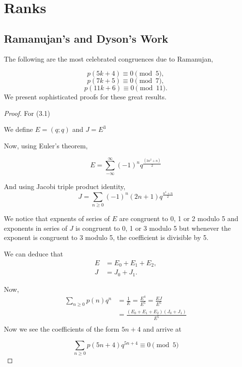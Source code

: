 \chapter{Ranks}
\section{Ramanujan's and Dyson's Work}

The following are the most celebrated congruences due to Ramanujan,

\begin{equation}
    p(5k+4) \equiv 0 \pmod 5,
\end{equation} 
\begin{equation}
    p(7k+5) \equiv 0 \pmod 7,
\end{equation} 
\begin{equation}
    p(11k+6) \equiv 0 \pmod{11}.
\end{equation}
We present sophisticated proofs for these great results.
\begin{proof}
For (3.1)

We define $E = (q;q)$ and $J = E^3$

Now, using Euler's theorem,

$$E = \sum_{-\infty}^\infty (-1)^n q^{\frac{(3n^2+n)}{2}}$$

And using Jacobi triple product identity,
$$J = \sum_{n\geq 0}(-1)^n(2n+1)q^{\frac{n^2+n}{2}}$$

We notice that expnents of series of $E$ are congruent to 0, 1 or 2 modulo 5 and exponents in series of $J$ is congruent to 0, 1 or 3 modulo 5 but whenever the exponent is congruent to 3 modulo 5, the coefficient is divisible by 5.

We can deduce that
\begin{align*}
    E &= E_0+E_1+E_2, \\
    J &= J_0 + J_1.
\end{align*}

Now,
\begin{equation}
\begin{split}
    \sum_{n\geq 0}p(n)q^n &= \frac{1}{E} = \frac{E^4}{E^5} = \frac{EJ}{E^5} \\
    &= \frac{(E_0+E_1+E_2)(J_0+J_1)}{E^5}\\
    \end{split}
\end{equation}
Now we see the coefficients of the form $5n+4$ and arrive at

$$\sum_{n\geq0}p(5n+4)q^{5n+4} \equiv 0 \pmod{5}$$
\end{proof}

